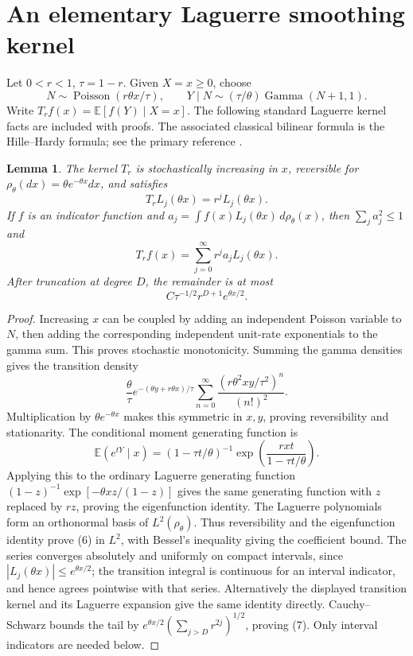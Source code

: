 \documentclass[11pt]{article}
\newtheorem{lemma}{Lemma}
\newcommand{\E}{\mathbb E}
\begin{document}
\section*{An elementary Laguerre smoothing kernel}
Let $0<r<1$, $\tau=1-r$. Given $X=x\ge0$, choose
\[
 N\sim\operatorname{Poisson}(r\theta x/\tau),
 \qquad Y\mid N\sim(\tau/\theta)\operatorname{Gamma}(N+1,1).
 \tag{5}
\]
Write $T_rf(x)=\E[f(Y)\mid X=x]$. The following standard Laguerre
kernel facts are included with proofs. The associated classical
bilinear formula is the Hille--Hardy formula; see the primary
reference \cite[18.18.27]{DLMF}.

\begin{lemma}\label{kernel}
The kernel $T_r$ is stochastically increasing in $x$, reversible for
$\rho_\theta(dx)=\theta e^{-\theta x}dx$, and satisfies
\[
 T_r L_j(\theta x)=r^jL_j(\theta x).
\]
If $f$ is an indicator function and
$a_j=\int f(x)L_j(\theta x)\,d\rho_\theta(x)$, then
$\sum_j a_j^2\le1$ and
\[
 T_rf(x)=\sum_{j=0}^{\infty}r^j a_jL_j(\theta x).
 \tag{6}
\]
After truncation at degree $D$, the remainder is at most
\[
 C\tau^{-1/2}r^{D+1}e^{\theta x/2}.               \tag{7}
\]
\end{lemma}
\begin{proof}
Increasing $x$ can be coupled by adding an independent Poisson
variable to $N$, then adding the corresponding independent unit-rate
exponentials to the gamma sum. This proves stochastic monotonicity.
Summing the gamma densities gives the transition density
\[
 \frac\theta\tau e^{-(\theta y+r\theta x)/\tau}
 \sum_{n=0}^{\infty}\frac{(r\theta^2xy/\tau^2)^n}{(n!)^2}.
\]
Multiplication by $\theta e^{-\theta x}$ makes this symmetric in
$x,y$, proving reversibility and stationarity. The conditional moment
generating function is
\[
 \E(e^{tY}\mid x)
 =(1-\tau t/\theta)^{-1}
       \exp\left(\frac{rxt}{1-\tau t/\theta}\right).
 \tag{8}
\]
Applying this to the ordinary Laguerre generating function
$(1-z)^{-1}\exp[-\theta xz/(1-z)]$ gives the same generating function
with $z$ replaced by $rz$, proving the eigenfunction identity.
The Laguerre polynomials form an orthonormal basis of
$L^2(\rho_\theta)$. Thus reversibility and the eigenfunction identity
prove (6) in $L^2$, with Bessel's inequality giving the coefficient
bound. The series converges absolutely and uniformly on compact
intervals, since $|L_j(\theta x)|\le e^{\theta x/2}$; the transition
integral is continuous for an interval indicator, and hence agrees
pointwise with that series. Alternatively the displayed transition
kernel and its Laguerre expansion give the same identity directly.
Cauchy--Schwarz bounds the tail by
$e^{\theta x/2}(\sum_{j>D}r^{2j})^{1/2}$, proving (7).
Only interval indicators are needed below.
\end{proof}
\end{document}
